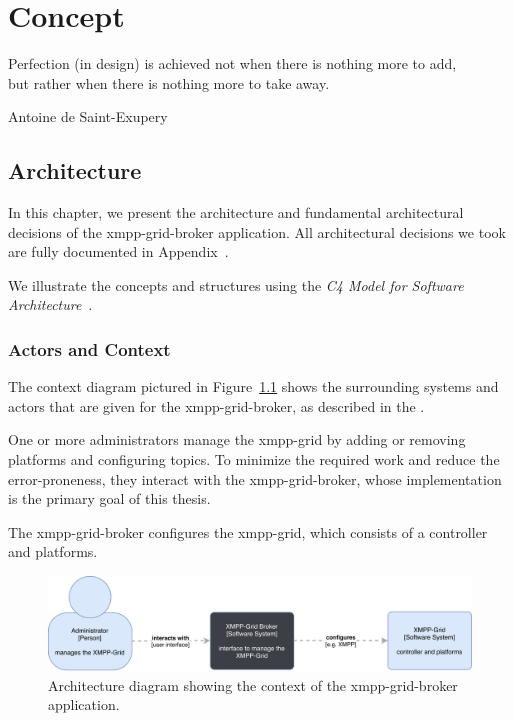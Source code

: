\chapter{Concept} %
\epigraph{Perfection (in design) is achieved not when there is nothing more to add,\\but rather when there is nothing more to take away.}{Antoine de Saint-Exupery}


\section{Architecture}\label{sec:architecture}

In this chapter, we present the architecture and fundamental architectural decisions of the \gls{xmpp-grid-broker} application.
All architectural decisions we took are fully documented in Appendix~.

We illustrate the concepts and structures using the \emph{C4 Model for Software Architecture}~\cite{c4-model}.

\subsection{Actors and Context}

The context diagram pictured in Figure~\ref{fig:architecturecontext} shows the surrounding systems and actors that are given for the \gls{xmpp-grid-broker}, as described in the .

One or more administrators manage the \gls{xmpp-grid} by adding or removing \glspl{platform} and configuring \glspl{topic}.
To minimize the required work and reduce the error-proneness, they interact with the \gls{xmpp-grid-broker}, whose implementation is the primary goal of this thesis.

The \gls{xmpp-grid-broker} configures the \gls{xmpp-grid}, which consists of a \gls{controller} and \glspl{platform}.

\begin{figure}[h]
\centering
\includegraphics[width=\linewidth]{resources/architecture_context}
\caption[Architecture Context Diagram]{Architecture diagram showing the context of the \gls{xmpp-grid-broker} application.}
\label{fig:architecturecontext}
\end{figure}


